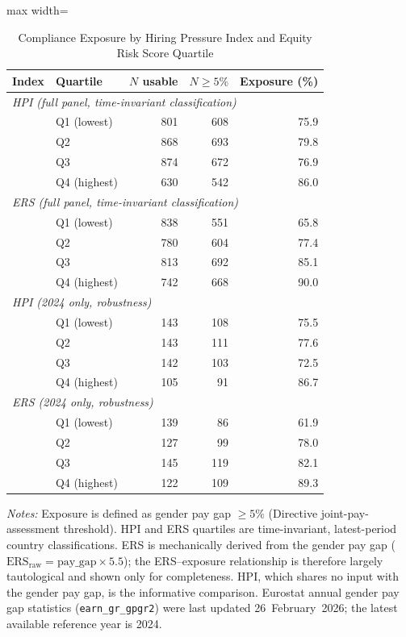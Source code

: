 \documentclass[12pt,a4paper]{article}
\begin{document}
\begin{table}[htbp]
\caption{Compliance Exposure by Hiring Pressure Index and Equity Risk Score
         Quartile}
\label{tab:exposure}
\begin{threeparttable}
\begin{adjustbox}{max width=\textwidth}
\begin{tabular}{llrrr}
\toprule
Index & Quartile & $N$ usable & $N \geq 5\%$ & Exposure (\%) \\
\midrule
\multicolumn{5}{l}{\textit{HPI (full panel, time-invariant classification)}} \\[2pt]
 & Q1 (lowest)  & 801 & 608 & 75.9 \\
 & Q2           & 868 & 693 & 79.8 \\
 & Q3           & 874 & 672 & 76.9 \\
 & Q4 (highest) & 630 & 542 & 86.0 \\[4pt]
\multicolumn{5}{l}{\textit{ERS (full panel, time-invariant classification)}} \\[2pt]
 & Q1 (lowest)  & 838 & 551 & 65.8 \\
 & Q2           & 780 & 604 & 77.4 \\
 & Q3           & 813 & 692 & 85.1 \\
 & Q4 (highest) & 742 & 668 & 90.0 \\[4pt]
\multicolumn{5}{l}{\textit{HPI (2024 only, robustness)}} \\[2pt]
 & Q1 (lowest)  & 143 & 108 & 75.5 \\
 & Q2           & 143 & 111 & 77.6 \\
 & Q3           & 142 & 103 & 72.5 \\
 & Q4 (highest) & 105 &  91 & 86.7 \\[4pt]
\multicolumn{5}{l}{\textit{ERS (2024 only, robustness)}} \\[2pt]
 & Q1 (lowest)  & 139 &  86 & 61.9 \\
 & Q2           & 127 &  99 & 78.0 \\
 & Q3           & 145 & 119 & 82.1 \\
 & Q4 (highest) & 122 & 109 & 89.3 \\
\bottomrule
\end{tabular}
\end{adjustbox}
\begin{tablenotes}
\footnotesize
\item \textit{Notes:} Exposure is defined as gender pay gap $\geq 5\%$
  (Directive joint-pay-assessment threshold).  HPI and ERS quartiles are
  time-invariant, latest-period country classifications.  ERS is mechanically
  derived from the gender pay gap ($\text{ERS}_\text{raw}=\text{pay\_gap}\times
  5.5$); the ERS--exposure relationship is therefore largely tautological and
  shown only for completeness.  HPI, which shares no input with the gender pay
  gap, is the informative comparison.
  Eurostat annual gender pay gap statistics (\texttt{earn\_gr\_gpgr2}) were last
  updated 26~February~2026; the latest available reference year is 2024.
\end{tablenotes}
\end{threeparttable}
\end{table}
\end{document}
